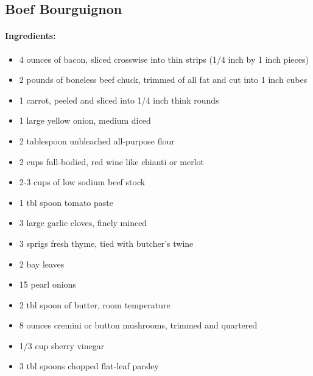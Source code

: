 \documentclass{article}
\begin{document}
\subsection{Boef Bourguignon}

\paragraph{Ingredients:}

\begin{itemize}
	\item 4 ounces of bacon, sliced crosswise into thin strips (1/4 inch by 1 inch pieces)
	\item 2 pounds of boneless beef chuck, trimmed of all fat and cut into 1 inch cubes
	\item 1 carrot, peeled and sliced into 1/4 inch think rounds
	\item 1 large yellow onion, medium diced
	\item 2 tablespoon unbleached all-purpose flour
	\item 2 cups full-bodied, red wine like chianti or merlot
	\item 2-3 cups of low sodium beef stock
	\item 1 tbl spoon tomato paste
	\item 3 large garlic cloves, finely minced
	\item 3 sprigs fresh thyme, tied with butcher's twine
	\item 2 bay leaves
	\item 15 pearl onions
	\item 2 tbl spoon of butter, room temperature
	\item 8 ounces cremini or button mushrooms, trimmed and quartered
	\item 1/3 cup sherry vinegar
	\item 3 tbl spoons chopped flat-leaf parsley
\end{itemize}
\end{document}
